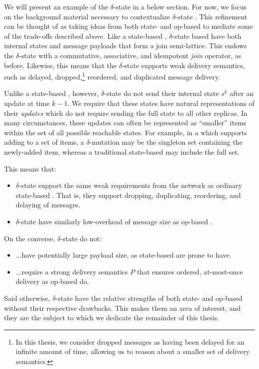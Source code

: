 We will present an example of the $\delta$-state \CRDT in a below section. For
now, we focus on the background material necessary to contextualize
$\delta$-state \CRDTs. This refinement can be thought of as taking ideas from
both state- and op-based \CRDTs to mediate some of the trade-offs described
above. Like a state-based \CRDT, $\delta$-state based \CRDTs have both internal
states and message payloads that form a join semi-lattice. This endows the
$\delta$-state \CRDT with a commutative, associative, and idempotent \emph{join}
operator, as before. Likewise, this means that the $\delta$-state \CRDT supports
weak delivery semantics, such as delayed, dropped,\footnote{In this thesis, we
consider dropped messages as having been delayed for an infinite amount of time,
allowing us to reason about a smaller set of delivery semantics.} reordered,
and duplicated message delivery.

Unlike a state-based \CRDT, however, $\delta$-state \CRDTs do not send their
internal state $s^k$ after an update at time $k-1$. We require that these states
have natural representations of their \emph{updates} which do not require
sending the full state to all other replicas. In many circumstances, these
updates can often be represented as ``smaller'' items within the set of all
possible reachable states. For example, in a \CRDT which supports adding to a
set of items, a $\delta$-mutation may be the singleton set containing the
newly-added item, whereas a traditional state-based \CRDT may include the full
set.

This means that:
\begin{itemize}
  \item $\delta$-state \CRDTs support the same weak requirements from the network
    as ordinary state-based \CRDTs. That is, they support dropping, duplicating,
    reordering, and delaying of messages.
  \item $\delta$-state \CRDTs have similarly low-overhead of message size as
    op-based \CRDTs.
\end{itemize}
On the converse, $\delta$-state \CRDTs do not:
\begin{itemize}
  \item ...have potentially large payload size, as state-based \CRDTs are prone
    to have.
  \item ...require a strong delivery semantics $P$ that ensures ordered,
    at-most-once delivery as op-based \CRDTs do.
\end{itemize}
Said otherwise, $\delta$-state \CRDTs have the relative strengths of both state-
and op-based \CRDTs without their respective drawbacks. This makes them an area
of interest, and they are the subject to which we dedicate the remainder of this
thesis.
